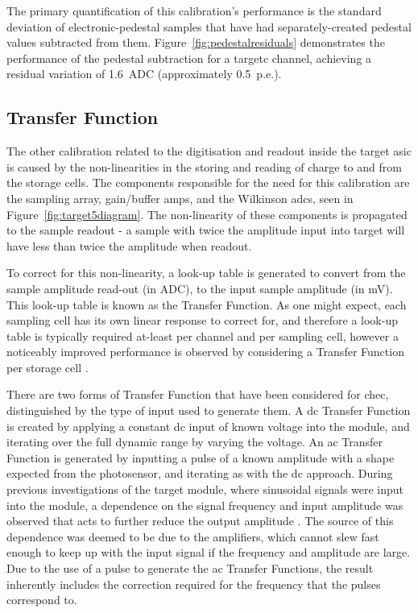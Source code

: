 The primary quantification of this calibration's performance is the standard deviation of electronic-pedestal samples that have had separately-created pedestal values subtracted from them. Figure~\ref{fig:pedestalresiduals} demonstrates the performance of the pedestal subtraction for a \gls{targetc} channel, achieving a residual variation of 1.6~ADC (approximately 0.5~p.e.).

\subsection{Transfer Function}

The other calibration related to the digitisation and readout inside the \gls{target} \gls{asic} is caused by the non-linearities in the storing and reading of charge to and from the storage cells. The components responsible for the need for this calibration are the sampling array, gain/buffer amps, and the Wilkinson \glspl{adc}, seen in Figure~\ref{fig:target5diagram}. The non-linearity of these components is propagated to the sample readout - a sample with twice the amplitude input into \gls{target} will have less than twice the amplitude when readout.

To correct for this non-linearity, a look-up table is generated to convert from the sample amplitude read-out (in ADC), to the input sample amplitude (in mV). This look-up table is known as the Transfer Function. As one might expect, each sampling cell has its own linear response to correct for, and therefore a look-up table is typically required at-least per channel and per sampling cell, however a noticeably improved performance is observed by considering a Transfer Function per storage cell .

There are two forms of Transfer Function that have been considered for \gls{chec}, distinguished by the type of input used to generate them. A \gls{dc} Transfer Function is created by applying a constant \gls{dc} input of known voltage into the module, and iterating over the full dynamic range by varying the voltage. An \gls{ac} Transfer Function is generated by inputting a pulse of a known amplitude with a shape expected from the photosensor, and iterating as with the \gls{dc} approach. During previous  investigations of the \gls{target} module, where sinusoidal signals were input into the module, a dependence on the signal frequency and input amplitude was observed that acts to further reduce the output amplitude \cite{Bechtol2012}\cite{Albert2017}. The source of this dependence was deemed to be due to the amplifiers, which cannot slew fast enough to keep up with the input signal if the frequency and amplitude are large. Due to the use of a pulse to generate the \gls{ac} Transfer Functions, the result inherently includes the correction required for the frequency that the pulses correspond to. 

